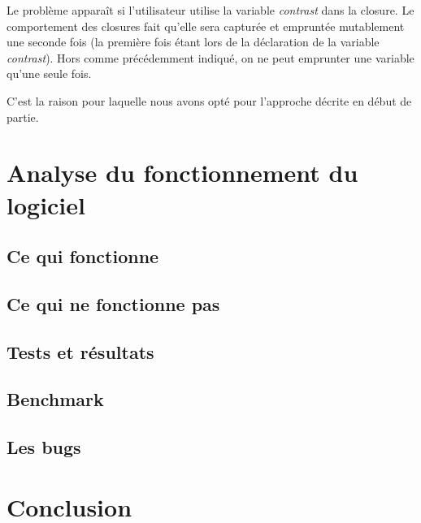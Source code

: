 \documentclass[12pt]{article}
\begin{document}
Le problème apparaît si l'utilisateur utilise la variable \textit{contrast} dans la
closure. Le comportement des closures fait qu'elle sera capturée et empruntée
mutablement une seconde fois (la première fois étant lors de la déclaration de la
variable \textit{contrast}). Hors comme précédemment indiqué, on ne peut emprunter une
variable qu'une seule fois.

C'est la raison pour laquelle nous avons opté pour l'approche décrite en début de
partie.

\section{Analyse du fonctionnement du logiciel}

\subsection{Ce qui fonctionne}

\subsection{Ce qui ne fonctionne pas}

\subsection{Tests et résultats}

\subsection{Benchmark}

\subsection{Les bugs}

\section{Conclusion}
\printglossaries
\printbibliography
\end{document}
